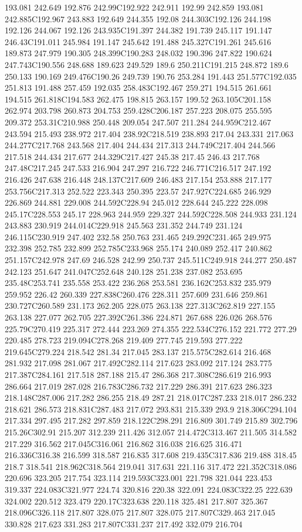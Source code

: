 193.081 242.649 192.876 242.99C192.922 242.911 192.99 242.859 193.081 242.885C192.967 243.883 192.649 244.355 192.08 244.303C192.126 244.198 192.126 244.067 192.126 243.935C191.397 244.382 191.739 245.117 191.147 246.43C191.011 245.984 191.147 245.642 191.488 245.327C191.261 245.616 189.873 247.979 190.305 248.399C190.283 248.032 190.396 247.822 190.624 247.743C190.556 248.688 189.623 249.529 189.6 250.211C191.215 248.872 189.6 250.133 190.169 249.476C190.26 249.739 190.76 253.284 191.443 251.577C192.035 251.813 191.488 257.459 192.035 258.483C192.467 259.271 194.515 261.661 194.515 261.818C194.583 262.475 198.815 263.157 199.52 263.105C201.158 262.974 203.798 260.873 204.753 259.428C206.187 257.223 208.075 255.595 209.372 253.31C210.988 250.448 209.054 247.507 211.284 244.959C212.467 243.594 215.493 238.972 217.404 238.92C218.519 238.893 217.04 243.331 217.063 244.277C217.768 243.568 217.404 244.434 217.313 244.749C217.404 244.566 217.518 244.434 217.677 244.329C217.427 245.38 217.45 246.43 217.768 247.48C217.245 247.533 216.904 247.297 216.722 246.771C216.517 247.192 216.426 247.638 216.448 248.137C217.609 246.483 217.154 253.888 217.177 253.756C217.313 252.522 223.343 250.395 223.57 247.927C224.685 246.929 226.869 244.881 229.008 244.592C228.94 245.012 228.644 245.222 228.098 245.17C228.553 245.17 228.963 244.959 229.327 244.592C228.508 244.933 231.124 243.883 230.919 244.014C229.918 245.563 231.352 244.749 231.124 246.115C230.919 247.402 232.58 250.763 231.465 249.292C231.465 249.975 232.398 252.785 232.899 252.785C233.968 255.174 240.089 252.417 240.862 251.157C242.978 247.69 246.528 242.99 250.737 245.511C249.918 244.277 250.487 242.123 251.647 241.047C252.648 240.128 251.238 237.082 253.695 235.48C253.741 235.558 253.422 236.268 253.581 236.162C253.832 235.979 259.952 226.42 260.339 227.838C260.476 228.311 257.609 231.646 259.861 230.727C260.589 231.173 262.205 228.075 263.138 227.313C262.819 227.155 263.138 227.077 262.705 227.392C261.386 224.871 267.688 226.026 268.576 225.79C270.419 225.317 272.444 223.269 274.355 222.534C276.152 221.772 277.29 220.485 278.723 219.094C278.268 219.409 277.745 219.593 277.222 219.645C279.224 218.542 281.34 217.045 283.137 215.575C282.614 216.468 281.932 217.098 281.067 217.492C282.114 217.623 283.092 217.124 283.775 217.387C284.161 217.518 287.188 215.47 286.368 217.308C286.619 216.993 286.664 217.019 287.028 216.783C286.732 217.229 286.391 217.623 286.323 218.148C287.006 217.282 286.255 218.49 287.21 218.017C287.233 218.017 286.232 218.621 286.573 218.831C287.483 217.072 293.831 215.339 293.9 218.306C294.104 217.334 297.495 217.282 297.859 218.122C298.291 216.809 301.749 215.89 302.796 215.26C302.91 215.207 312.239 211.426 312.057 214.472C313.467 211.505 314.582 217.229 316.562 217.045C316.061 216.862 316.038 216.625 316.471 216.336C316.38 216.599 318.587 216.835 317.608 219.435C317.836 219.488 318.45 218.7 318.541 218.962C318.564 219.041 317.631 221.116 317.472 221.352C318.086 220.696 323.205 217.754 323.114 219.593C323.001 221.798 321.044 223.453 319.337 224.083C321.977 224.74 320.816 220.38 322.091 224.083C322.25 222.639 324.002 220.512 323.479 220.17C323.638 220.118 325.481 217.807 325.367 218.096C326.118 217.807 328.075 217.807 328.075 217.807C329.463 217.045 330.828 217.623 331.283 217.807C331.237 217.492 332.079 216.704 